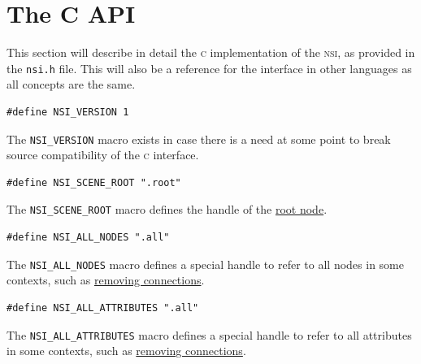 \documentclass[oneside,ebook]{memoir}
\newcommand*{\acronym}[1]{\textsc{\lowercase{#1}}}
\begin{document}
\section{The C API}

This section will describe in detail the \acronym{C} implementation of the \acronym{NSI}, as provided in the \lstinline|nsi.h| file. This will also be a reference for the interface in other languages as all concepts are the same.

\begin{lstlisting}[style=CAPI]
#define NSI_VERSION 1
\end{lstlisting}
The \lstinline|NSI_VERSION| macro exists in case there is a need at some point to break source compatibility of the \acronym{C} interface.

\begin{lstlisting}[style=CAPI]
#define NSI_SCENE_ROOT ".root"
\end{lstlisting}
The \lstinline|NSI_SCENE_ROOT| macro defines the handle of the \hyperref[section:rootnode]{root node}.

\label{NSI_ALL_NODES}
\begin{lstlisting}[style=CAPI]
#define NSI_ALL_NODES ".all"
\end{lstlisting}
The \lstinline|NSI_ALL_NODES| macro defines a special handle to refer to all nodes in some contexts, such as \hyperref[CAPI:nsidisconnect]{removing connections}.

\label{NSI_ALL_ATTRIBUTES}
\begin{lstlisting}[style=CAPI]
#define NSI_ALL_ATTRIBUTES ".all"
\end{lstlisting}
The \lstinline|NSI_ALL_ATTRIBUTES| macro defines a special handle to refer to all attributes in some contexts, such as \hyperref[CAPI:nsidisconnect]{removing connections}.
\end{document}
